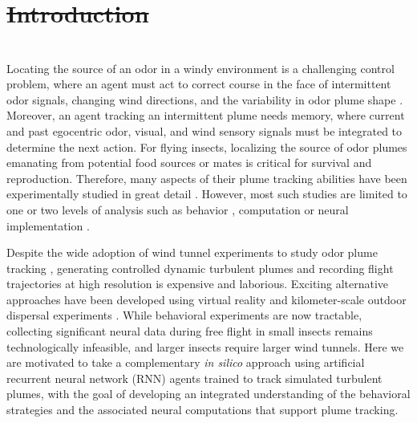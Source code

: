 \documentclass[5p,twocolumn,authoryear]{elsarticle}
\providecommand{\DIFaddtex}[1]{{\protect\color{blue}\uwave{#1}}} %
\providecommand{\DIFdeltex}[1]{{\protect\color{red}\sout{#1}}}                      %
\providecommand{\DIFaddbegin}{} %
\providecommand{\DIFaddend}{} %
\providecommand{\DIFdelbegin}{} %
\providecommand{\DIFdelend}{} %
\providecommand{\DIFadd}[1]{\texorpdfstring{\DIFaddtex{#1}}{#1}} %
\providecommand{\DIFdel}[1]{\texorpdfstring{\DIFdeltex{#1}}{}} %
\newcommand{\DIFscaledelfig}{0.5}
\newlength{\DIFdelgraphicswidth} %
\newlength{\DIFdelgraphicsheight} %
\newcommand{\DIFaddincludegraphics}[2][]{{\color{blue}\fbox{\DIFOincludegraphics[#1]{#2}}}} %
\newcommand{\DIFdelincludegraphics}[2][]{%
\sbox{\DIFdelgraphicsbox}{\DIFOincludegraphics[#1]{#2}}%
\settoboxwidth{\DIFdelgraphicswidth}{\DIFdelgraphicsbox} %
\settoboxtotalheight{\DIFdelgraphicsheight}{\DIFdelgraphicsbox} %
\scalebox{\DIFscaledelfig}{%
\parbox[b]{\DIFdelgraphicswidth}{\usebox{\DIFdelgraphicsbox}\\[-\baselineskip] \rule{\DIFdelgraphicswidth}{0em}}\llap{\resizebox{\DIFdelgraphicswidth}{\DIFdelgraphicsheight}{%
\setlength{\unitlength}{\DIFdelgraphicswidth}%
\begin{picture}(1,1)%
\thicklines\linethickness{2pt} %
{\color[rgb]{1,0,0}\put(0,0){\framebox(1,1){}}}%
{\color[rgb]{1,0,0}\put(0,0){\line( 1,1){1}}}%
{\color[rgb]{1,0,0}\put(0,1){\line(1,-1){1}}}%
\end{picture}%
}\hspace*{3pt}}} %
} %
\DeclareRobustCommand{\DIFaddbegin}{\DIFOaddbegin \let\includegraphics\DIFaddincludegraphics} %
\DeclareRobustCommand{\DIFaddend}{\DIFOaddend \let\includegraphics\DIFOincludegraphics} %
\DeclareRobustCommand{\DIFdelbegin}{\DIFOdelbegin \let\includegraphics\DIFdelincludegraphics} %
\DeclareRobustCommand{\DIFdelend}{\DIFOaddend \let\includegraphics\DIFOincludegraphics} %
\begin{document}
\DIFdelbegin \section{\DIFdel{Introduction}}
\addtocounter{section}{-1}%
\DIFdelend \DIFaddbegin \section*{\DIFadd{Introduction}}
\DIFaddend Locating the source of an odor in a windy environment is a challenging control problem, where an agent must act to correct course in the face of intermittent odor signals, changing wind directions, and the variability in odor plume shape \citep{reddyannrev,celani2014odor}.
Moreover, an agent tracking an intermittent plume needs memory, where current and past egocentric 
odor, visual, and wind sensory signals must be integrated to determine the next action.
For flying insects, localizing the source of odor plumes emanating from potential food sources or mates is critical for survival and reproduction.
Therefore, many aspects of their plume tracking abilities have been experimentally studied in great detail \citep{baker2018algorithms, park2016neurally, carde2008navigational,currier2020multisensory}.
However, most such studies are limited to one or two levels of analysis such as behavior \citep{van2008insects}, computation \citep{lochmatter2009theoretical,pang2018history} or neural implementation \citep{sun2018analysis}.

Despite the wide adoption of wind tunnel experiments to study odor plume tracking \citep{van2014plume}, generating controlled dynamic turbulent plumes and recording flight trajectories at high resolution is expensive and laborious.
Exciting alternative approaches have been developed using virtual reality \citep{kaushik2020characterizing}
and kilometer-scale outdoor dispersal experiments \citep{leitch2020long}. 
While behavioral experiments are now tractable, collecting significant neural data during free flight in small insects remains technologically infeasible, and larger insects require larger wind tunnels.
Here we are motivated to take a complementary \textit{in silico} approach using artificial recurrent neural network (RNN) agents trained to track simulated turbulent plumes, with the goal of developing an integrated understanding of the behavioral strategies and the associated neural computations that support plume tracking.
\end{document}
